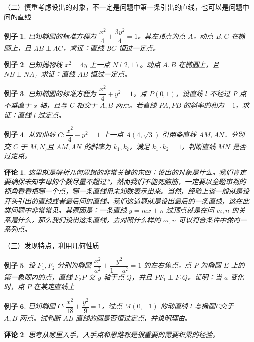 \documentclass[a4paper,10pt,twoside]{article}
\newtheorem{example}{例子}[section]
\newtheorem{remark}{评论}
\begin{document}
（二）慎重考虑设出的对象，不一定是问题中第一条引出的直线，也可以是问题中问的直线
\begin{example}
    已知椭圆的标准方程为 $ \dfrac{x ^2 }{4}+\dfrac{3y^2}{4}=1 $。其左顶点为点 $ A  $，动点 $ B,C  $ 在椭圆上，且 $ AB\perp AC  $，求证：直线 $ BC  $ 恒过一定点。 
\end{example}
\begin{example}
    已知抛物线 $ x^2=4y $ 上一点 $ N (2,1) $。动点 $ A,B  $ 在椭圆上，且 $ NB\perp NA  $，求证：直线 $ AB  $ 恒过一定点。
\end{example}
\begin{example}
    已知椭圆的标准方程为 $ \dfrac{x ^2 }{4}+y^2=1 $。点 $ P(0,1) $，设直线 $ l  $ 不经过 $ P  $ 点不垂直于 $ x  $ 轴，且与 $ C  $ 相交于 $ A,B  $ 两点。若直线 $ PA,PB  $ 的斜率的和为 $ -1  $，求证：直线 $ l $ 过定点。
\end{example}
\begin{example}
    从双曲线 $ C:\dfrac{x^2}{4}-y^2=1 $ 上一点 $ A(4,\sqrt{3}) $ 引两条直线 $ AM,AN  $，分别交 $ C  $ 于 $ M,N  $,且 $ AM,AN  $ 的斜率为 $ k_1,k_2 $，满足 $ k_1\cdot k_2=1 $，判断直线 $ MN  $ 是否过定点。    
\end{example}
\begin{remark}
    这里就是解析几何思想的非常关键的东西：设出的对象是什么。我们肯定要确保未知字母的个数尽量不超过3，然而我们不能死脑筋，一定要以全题审视的视角看看把哪一个点，哪一条直线用未知数表示出来。当然，经验上谈一般就是设开头引出的直线或者最后问的直线。我们这道题就是设出最后的一条直线，这在此类问题中非常常见。其原因是：一条直线 $ y=mx+n  $ 过顶点就是在问 $ m,n  $ 的关系是什么，那么我们设出这条直线，去对照什么样的 $ m,n  $ 可以符合条件中做的一系列点。
\end{remark}
（三）发现特点，利用几何性质
\begin{example}
    设 $ F_1,F_2  $ 分别为椭圆 $ \dfrac{x^2}{a^2}+\dfrac{y^2 }{1-a^2 }=1 $ 的左右焦点，点 $ P  $ 为椭圆 $ E  $ 上的第一象限内的点，直线 $ F_2P  $ 交 $ y  $ 轴于点 $ Q  $，并且 $ PF_1\perp F_1Q  $。证明：当 $ a  $ 变化时，点 $ P  $ 在某定直线上
\end{example}
\begin{example}
    已知椭圆 $ C:\dfrac{x^2 }{18 }+\dfrac{y^2}{9}=1 $，过点 $ M(0,-1) $ 的动直线 $ l  $ 与椭圆C交于 $ A,B  $ 两点。试判断 $ AB  $ 直线的圆是否恒过定点，并说明理由。  
\end{example}
\begin{remark}
    思考从哪里入手，入手点和思路都是很重要的需要积累的经验。
\end{remark}
\end{document}
